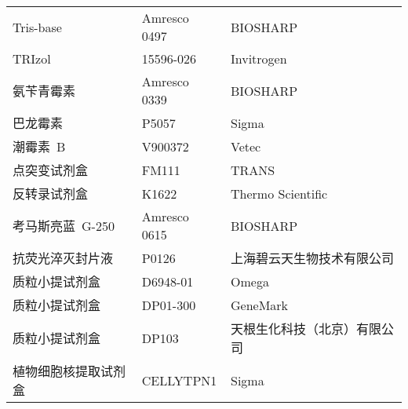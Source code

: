\begin{longtable}{lll @{}}
Tris-base           &   Amresco 0497 & BIOSHARP\\
TRIzol              &   15596-026    & Invitrogen\\
氨苄青霉素          &   Amresco 0339 & BIOSHARP         \\
巴龙霉素            &   P5057   &   Sigma               \\
潮霉素\ B           &   V900372 &   Vetec               \\
点突变试剂盒        &   FM111   &   TRANS               \\
反转录试剂盒        &   K1622   & Thermo Scientific\\
考马斯亮蓝\ G-250   &   Amresco 0615 & BIOSHARP         \\
抗荧光淬灭封片液    &   P0126   &   上海碧云天生物技术有限公司\\
质粒小提试剂盒      &   D6948-01&   Omega               \\
质粒小提试剂盒      &   DP01-300&   GeneMark            \\
质粒小提试剂盒      &   DP103   &   天根生化科技（北京）有限公司\\
植物细胞核提取试剂盒& CELLYTPN1 &Sigma                \\
\bottomrule
\end{longtable}